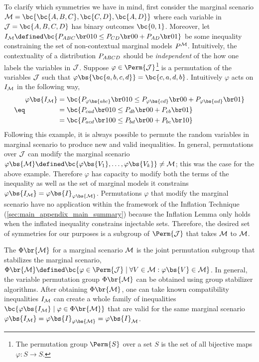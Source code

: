 \documentclass[aps, 10pt, english, twoside, pra, nofootinbib, tightenlines, longbibliography, superscriptaddress]{revtex4-1}
\begin{document}
    To clarify which symmetries we have in mind, first consider the marginal scenario $\mscenario = \bc{\bc{A, B, C}, \bc{C, D}, \bc{A, D}}$ where each variable in $\jointvar = \bc{A,B,C,D}$ has binary outcomes $\bc{0,1}$. Moreover, let $I_{\mscenario} \defined \bc{\prob[ABC][010] \leq \prob[CD][00] + \prob[AD][01]}$ be some inequality constraining the set of non-contextual marginal models $\prob^{\mscenario}$. Intuitively, the contextuality of a distribution $\prob[ABCD]$ should be \textit{independent} of the how one labels the variables in $\mathcal{J}$. Suppose $\varphi \in \Perm{\jointvar}$\footnote{The permutation group $\Perm{S}$ over a set $S$ is the set of all bijective maps $\varphi : S \to S$.} is a permutation of the variables $\mathcal{J}$ such that $\varphi\bs{\bc{a,b,c,d}} = \bc{c,a,d,b}$. Intuitively $\varphi$ acts on $I_{\mathcal{M}}$ in the following way,
    \begin{align*}
    \eq \label{eq:symmetry_example}
    \begin{split}
        \varphi\bs{I_{\mscenario}} &= \bc{\prob[\varphi\bs{abc}][010] \leq \prob[\varphi\bs{cd}][00] + \prob[\varphi\bs{ad}][01]} \\
        &= \bc{\prob[cad][010] \leq \prob[db][00] + \prob[cb][01]} \\
        &= \bc{\prob[acd][100] \leq \prob[bd][00] + \prob[bc][10]}
    \end{split}
    \end{align*}
    Following this example, it is always possible to permute the random variables in marginal scenario to produce new and valid inequalities. In general, permutations over $\mathcal{J}$ can modify the marginal scenario $\varphi\bs{\mscenario} \defined \bc{\varphi\bs{V_1}, \ldots, \varphi\bs{V_k}} \neq \mscenario$; this was the case for the above example. Therefore $\varphi$ has capacity to modify both the terms of the inequality as well as the set of marginal models it constrains $\varphi\bs{I_{\mscenario}} = \varphi\bs{I}_{\varphi\bs{\mscenario}}$. Permutations $\varphi$ that modify the marginal scenario have no application within the framework of the Inflation Technique (\cref{sec:main_appendix_main_summary}) because the Inflation Lemma only holds when the inflated inequality constrains injectable sets. Therefore, the desired set of symmetries for our purposes is a subgroup of $\Perm{\jointvar}$ that takes $\mathcal{M}$ to $\mathcal{M}$.

    The  $\gp\br{\mscenario}$ for a marginal scenario $\mathcal{M}$ is the joint permutation subgroup that stabilizes the marginal scenario, $\Phi\br{\mscenario} \defined \bc{\varphi \in \Perm{\jointvar} \mid \forall V \in \mscenario : \varphi\bs{V} \in \mscenario}$.
    In general, the variable permutation group $\gp\br{\mscenario}$ can be obtained using group stabilizer algorithms. After obtaining $\gp\br{\mscenario}$, one can take known compatibility inequalities $I_{\mathcal{M}}$ can create a whole family of inequalities $\bc{\varphi\bs{I_{\mscenario}} \mid \varphi \in \gp\br{\mscenario}}$ that are valid for the same marginal scenario $\varphi\bs{I_{\mscenario}} = \varphi\bs{I}_{\varphi\bs{\mscenario}} = \varphi\bs{I}_{\mscenario}$.
\end{document}
